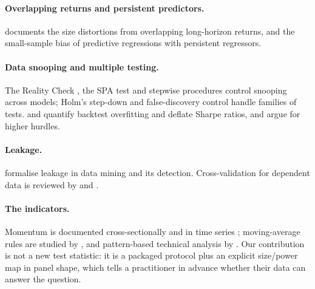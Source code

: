 \documentclass[11pt]{article}
\begin{document}
\paragraph{Overlapping returns and persistent predictors.} \citet{hodrick1992} documents the size distortions from overlapping long-horizon returns, and \citet{stambaugh1999} the small-sample bias of predictive regressions with persistent regressors.
\paragraph{Data snooping and multiple testing.} The Reality Check \citep{white2000}, the SPA test \citep{hansen2005} and stepwise procedures \citep{romano2005} control snooping across models; Holm's step-down \citep{holm1979} and false-discovery control \citep{benjamini1995} handle families of tests. \citet{bailey2014,bailey2016} and \citet{bailey2014b} quantify backtest overfitting and deflate Sharpe ratios, and \citet{harvey2015,harvey2015b} argue for higher hurdles.
\paragraph{Leakage.} \citet{kaufman2012} formalise leakage in data mining and its detection. Cross-validation for dependent data is reviewed by \citet{arlot2010} and \citet{bergmeir2012}.
\paragraph{The indicators.} Momentum is documented cross-sectionally \citep{jegadeesh1993} and in time series \citep{moskowitz2012}; moving-average rules are studied by \citet{brock1992}, and pattern-based technical analysis by \citet{lo2000}.
Our contribution is not a new test statistic: it is a packaged protocol plus an explicit size/power map in panel shape, which tells a practitioner in advance whether their data can answer the question.
\end{document}
